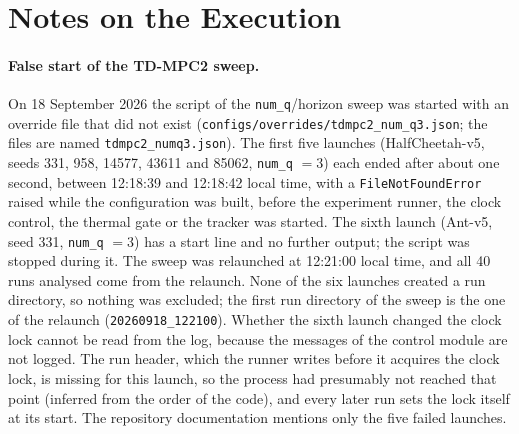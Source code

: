 \begin{table}[tbp]
  \centering
  \footnotesize
  \caption{Execution sessions of the \num{280} canonical runs (times in UTC, taken from the start and end times in the metadata of the runs).
    Span is the time from the first start to the last end, gap the time since the end of the previous session.
    In the runs column, HC is HalfCheetah-v5 and Ant is Ant-v5.}
  \label{tab:sessions}
\end{table}

\section{Notes on the Execution}\label{sec:app-repro-notes}

\paragraph{False start of the TD-MPC2 sweep.} On 18 September 2026 the script of the \texttt{num\_q}/horizon sweep was started with an override file that did not exist (\texttt{configs/overrides/tdmpc2\_num\_q3.json}; the files are named \texttt{tdmpc2\_numq3.json}).
The first five launches (HalfCheetah-v5, seeds \num{331}, \num{958}, \num{14577}, \num{43611} and \num{85062}, \texttt{num\_q} $=3$) each ended after about one second, between 12:18:39 and 12:18:42 local time, with a \texttt{FileNotFoundError} raised while the configuration was built, before the experiment runner, the clock control, the thermal gate or the tracker was started.
The sixth launch (Ant-v5, seed \num{331}, \texttt{num\_q} $=3$) has a start line and no further output; the script was stopped during it.
The sweep was relaunched at 12:21:00 local time, and all \num{40} runs analysed come from the relaunch.
None of the six launches created a run directory, so nothing was excluded; the first run directory of the sweep is the one of the relaunch (\texttt{20260918\_122100}).
Whether the sixth launch changed the clock lock cannot be read from the log, because the messages of the control module are not logged.
The run header, which the runner writes before it acquires the clock lock, is missing for this launch, so the process had presumably not reached that point (inferred from the order of the code), and every later run sets the lock itself at its start.
The repository documentation mentions only the five failed launches.

